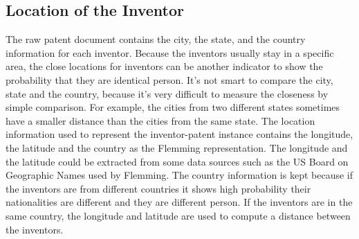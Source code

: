 \subsection{Location of the Inventor}
The raw patent document contains the city, the state, and the country information for each inventor. Because the inventors usually stay in a specific area, the close locations for inventors can be another indicator to show the probability that they are identical person. It's not smart to compare the city, state and the country, because it's very difficult to measure the closeness by simple comparison. For example, the cities from two different states sometimes have a smaller distance than the cities from the same state. The location information used to represent the inventor-patent instance contains the longitude, the latitude and the country as the Flemming representation. The longitude and the latitude could be extracted from some data sources such as the US Board on Geographic Names used by Flemming. The country information is kept because if the inventors are from different countries it shows high probability their nationalities are different and they are different person. If the inventors are in the same country, the longitude and latitude are used to compute a distance between the inventors.



